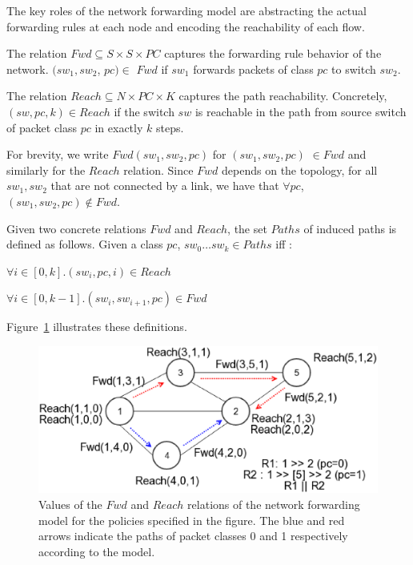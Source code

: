 The key roles of the network forwarding model are abstracting the actual forwarding rules at each node and encoding the reachability of each flow. 
\begin{mydef}
\label{def:fwd}
The relation $Fwd \subseteq S \times S \times PC $ captures the forwarding rule behavior of the network. 
$(sw_1, sw_2$, $pc)\in$ $Fwd$ if 
$sw_1$ forwards packets of class $pc$ to switch $sw_2$. 
\end{mydef}
\begin{mydef}
\label{def:reach}
	The relation $Reach \subseteq N \times PC \times K$ captures the path reachability.   
	Concretely, $(sw, pc, k)\in Reach$ if 
	the switch $sw$ is reachable in the path from source switch of packet class $pc$ in exactly $k$ steps.  
\end{mydef}
For brevity, we write $Fwd(sw_1, sw_2, pc)$ for $(sw_1, sw_2, pc) $ $\in Fwd$ and similarly for the $Reach$ relation. 
Since $Fwd$ depends on the topology,
for all $sw_1, sw_2$ that are not connected by a link, 
we have that $\forall pc$, $(sw_1,sw_2,pc) \notin Fwd$. 

Given two concrete relations $Fwd$ and $Reach$, 
the set $Paths$ of induced paths is defined as follows.
Given a class $pc$,  $sw_0 \ldots sw_k \in Paths$ iff : 
\begin{compactenumerate}
	\item $\forall i \in [0,k]. (sw_i, pc, i) \in Reach$
	\item $\forall i \in [0, k - 1]. (sw_i, sw_{i+1}, pc) \in Fwd$
\end{compactenumerate}
Figure~\ref{fig:model} illustrates these definitions.

\begin{figure}[!th]
	\centering
	\includegraphics[width=\columnwidth]{figures/network-model-example.eps}
	\caption{Values of the $Fwd$ and $Reach$ relations of the network forwarding model
		 for the policies specified in the figure. The blue and red arrows indicate the 
		 paths of packet classes 0 and 1 respectively according to the model.}
	\label{fig:model}
\end{figure}

